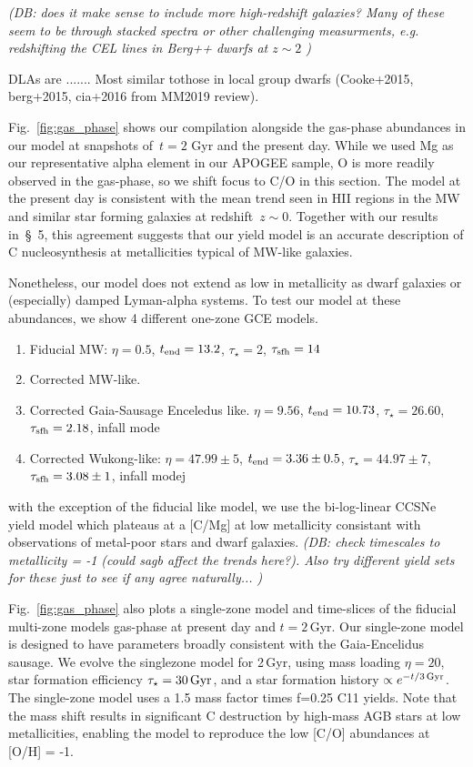 \documentclass[fleqn,
usenatbib]{mnras}
\newcommand{\dbnote}[1]{ {\color{Thistle} \textit{\small (DB: #1)}} }
\begin{document}
\dbnote{does it make sense to include more high-redshift galaxies? 
Many of these seem to be through stacked spectra or other challenging measurments, e.g. redshifting the CEL lines in Berg++ dwarfs at $z\sim 2$
}

DLAs are .......
Most similar tothose in local group dwarfs (Cooke+2015, berg+2015, cia+2016 from MM2019 review).


Fig.~\ref{fig:gas_phase} shows our compilation alongside the gas-phase abundances in our model
at snapshots of~$t = 2$ Gyr and the present day.
While we used Mg as our representative alpha element in our APOGEE sample, O
is more readily observed in the gas-phase, so we shift focus to C/O in this
section.
The model at the present day is consistent with the mean trend seen in HII
regions in the MW and similar star forming galaxies at redshift~$z \sim 0$.
Together with our results in~\S~5, this agreement suggests that our yield model
is an accurate description of C nucleosynthesis at metallicities typical of
MW-like galaxies.

Nonetheless, our model does not extend as low in metallicity as dwarf galaxies
or (especially) damped Lyman-alpha systems.
To test our model at these abundances, we show 4 different one-zone GCE models.
\begin{enumerate}
    \item Fiducial MW: $\eta=0.5$, $t_{\rm end} = 13.2$, $\tau_\star=2$, $\tau_{\rm sfh} = 14$
    \item Corrected MW-like. 
    \item Corrected Gaia-Sausage Enceledus like. $\eta=9.56$, $t_{\rm end}=10.73$, $\tau_\star = 26.60$, $\tau_{\rm sfh} = 2.18$, infall mode
    \item Corrected Wukong-like: $\eta=47.99\pm 5$, $t_{\rm end} = 3.36\pm 0.5$, $\tau_\star=44.97\pm 7$, $\tau_{\rm sfh} = 3.08\pm 1$, infall modej
\end{enumerate}
with the exception of the fiducial like model, we use the bi-log-linear CCSNe yield model which plateaus at a [C/Mg] at low metallicity consistant with observations of metal-poor stars and dwarf galaxies.
\dbnote{check timescales to metallicity = -1 (could sagb affect the trends here?). Also try different yield sets for these just to see if any agree naturally... }

Fig.~\ref{fig:gas_phase} also plots a single-zone model and time-slices of the fiducial multi-zone models gas-phase at present day and $t=2$\,Gyr. 
Our single-zone model is designed to have parameters broadly consistent with the Gaia-Encelidus sausage.
We evolve the singlezone model for 2\,Gyr, using mass loading $\eta=20$, star formation efficiency $\tau_{\star}=30\,{\rm Gyr}$, and a star formation history $\propto e^{-t/3{\rm\,Gyr}}$.
The single-zone model uses a 1.5 mass factor times f=0.25 C11 yields. Note that the mass shift results in significant C destruction by high-mass AGB stars at low metallicities, enabling the model to reproduce the low [C/O] abundances at [O/H] = -1.
\end{document}
